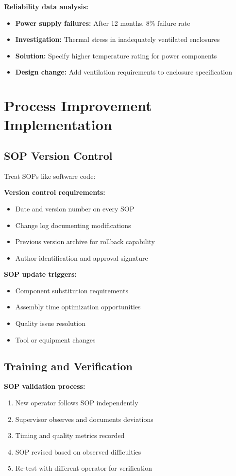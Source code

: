 \textbf{Reliability data analysis:}
\begin{itemize}
\item \textbf{Power supply failures:} After 12 months, 8\% failure rate
\item \textbf{Investigation:} Thermal stress in inadequately ventilated enclosures
\item \textbf{Solution:} Specify higher temperature rating for power components
\item \textbf{Design change:} Add ventilation requirements to enclosure specification
\end{itemize}

\section{Process Improvement Implementation}

\subsection{SOP Version Control}

Treat SOPs like software code:

\textbf{Version control requirements:}
\begin{itemize}
\item Date and version number on every SOP
\item Change log documenting modifications
\item Previous version archive for rollback capability
\item Author identification and approval signature
\end{itemize}

\textbf{SOP update triggers:}
\begin{itemize}
\item Component substitution requirements
\item Assembly time optimization opportunities
\item Quality issue resolution
\item Tool or equipment changes
\end{itemize}

\subsection{Training and Verification}

\textbf{SOP validation process:}
\begin{enumerate}
\item New operator follows SOP independently
\item Supervisor observes and documents deviations
\item Timing and quality metrics recorded
\item SOP revised based on observed difficulties
\item Re-test with different operator for verification
\end{enumerate}

